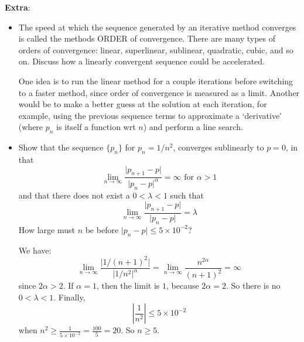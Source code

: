 \documentclass{article}
\begin{document}
\newpage
\textbf{Extra}:
\begin{itemize}
    \item The speed at which the sequence generated by an iterative method converges is called the methods ORDER of convergence. There are many types of orders of convergence: linear, superlinear, sublinear, quadratic, cubic, and so on. Discuss how a linearly convergent sequence could be accelerated.
        \begin{answer}
            One idea is to run the linear method for a couple iterations before switching to a faster method, since order of convergence is measured as a limit. Another would be to make a better guess at the solution at each iteration, for example, using the previous sequence terms to approximate a `derivative' (where $p_{n}$ is itself a function wrt $n$) and perform a line search. 
        \end{answer}

    \item Show that the sequence $\{p_{n}\}$ for $p_{n} = 1/n^{2}$, converges sublinearly to $p = 0$, in that 
        \begin{equation*}
            \lim\limits_{n \to \infty}\dfrac{\lvert p_{n + 1} - p \rvert}{\lvert p_{n} - p \rvert^{\alpha}} = \infty \text{ for } \alpha > 1
        \end{equation*}
    and that there does not exist a $0 < \lambda < 1$ such that 
        \begin{equation*}
            \lim\limits_{n \to \infty} \dfrac{\lvert p_{n + 1} - p \rvert}{\lvert p_{n} - p \rvert} = \lambda
        \end{equation*}
    How large must $n$ be before $\lvert p_{n} - p \rvert \leq 5 \times 10^{-2}$?
    \begin{answer}
        We have:
            \begin{equation*}
                \lim\limits_{n \to \infty} \dfrac{\lvert 1 / (n + 1)^{2} \rvert}{\lvert 1 / n^{2} \rvert^{\alpha}} = \lim\limits_{n \to \infty}\dfrac{n^{2\alpha}}{(n + 1)^{2}} = \infty
            \end{equation*}
        since $2\alpha > 2$. If $\alpha = 1$, then the limit is $1$, because $2\alpha = 2$. So there is no $0 < \lambda < 1$. Finally, 
            \begin{equation*}
                \left\lvert \dfrac{1}{n^{2}} \right\rvert \leq 5 \times 10^{-2}
            \end{equation*}
        when $n^{2} \geq \frac{1}{5 \times 10^{-2}} = \frac{100}{5} = 20$. So $n \geq 5$.
    \end{answer}
\end{itemize}
    
\end{document}
